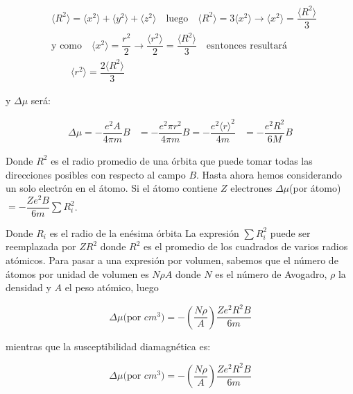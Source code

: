 \begin{equation}
\begin{aligned}
&\langle R^{2} \rangle = \langle x^{2}\rangle + \langle y^{2} \rangle + \langle z^{2} \rangle \quad \text{luego} \quad \langle R^{2} \rangle = 3\langle x^{2}\rangle\rightarrow \langle x^{2} \rangle = \dfrac{\langle R^{2}\rangle}{3} \\
& \text{y como} \quad \langle x^{2}\rangle = \dfrac{r^{2}}{2} \rightarrow \dfrac{\langle r^{2} \rangle}{2}=\dfrac{\langle R^{2} \rangle}{3} \quad \text{esntonces resultará}\\
& \qquad \langle r^{2} \rangle= \dfrac{2\langle R^{2} \rangle}{3}
\end{aligned}
\end{equation}

y $\Delta\mu$ será:

\begin{equation}
\begin{aligned}
\Delta \mu = -\dfrac{e^{2}A}{4\pi m}B &= -\dfrac{e^{2}\pi r^{2} }{4\pi m}B = -\dfrac{e^{2}\langle r \rangle^{2}}{4m} &= -\dfrac{e^{2}R^{2}}{6M}B
\end{aligned}
\end{equation}

Donde $R^{2}$ es el radio promedio de una órbita que puede tomar todas las direcciones posibles con respecto al campo $B$. Hasta ahora hemos considerando un solo electrón en el átomo. Si el átomo contiene $Z$ electrones $\Delta\mu$(por átomo) $=-\dfrac{Ze^{2}B}{6m}\sum R_{i}^{2}$.

Donde $R_{i}$ es el radio de la enésima órbita La expresión $\sum R_{i}^{2}$ puede ser reemplazada por $ZR^{2}$ donde $R^{2}$ es el promedio de los cuadrados de varios radios atómicos. Para pasar a una expresión por volumen, sabemos que el número de átomos por unidad de volumen es $N\rho A$ donde $N$ es el número de Avogadro, $\rho$ la densidad y $A$ el peso atómico, luego

\begin{equation}
	\Delta\mu\text{(por $cm^3$)} =- \left( \dfrac{N\rho}{A}\right) \dfrac{Ze^{2}R^{2}B}{6m}
\end{equation}


mientras que la susceptibilidad diamagnética es:

\begin{equation}
	\Delta\mu\text{(por $cm^3$)} =- \left( \dfrac{N\rho}{A}\right) \dfrac{Ze^{2}R^{2}B}{6m}
\end{equation}

